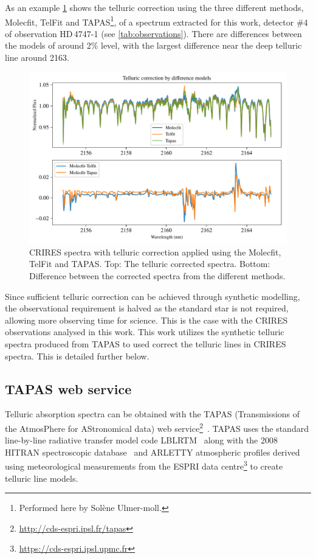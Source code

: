As an example \cref{fig:telluricmodelcomparision} shows the telluric correction using the three different methods, {Molecfit}, {TelFit} and {TAPAS}\footnote{Performed here by Sol\`{e}ne Ulmer-moll.}, of a spectrum extracted for this work, detector \#4 of observation HD\,4747-1  (see \cref{tab:observations}).
There are differences between the models of around 2\% level, with the largest difference near the deep telluric line around 2163\nm{}.
\begin{figure}
    \centering
    \includegraphics[width=0.8\linewidth]{figures/atmos_and_models/Telluric_model_comparision}
    \caption[Telluric correction applied using the {Molecfit}, {TelFit} and {TAPAS}.]{CRIRES spectra with telluric correction applied using the {Molecfit}, {TelFit} and {TAPAS}.
        Top: The telluric corrected spectra.
        Bottom: Difference between the corrected spectra from the different methods.}
    \label{fig:telluricmodelcomparision}
\end{figure}

Since sufficient telluric correction can be achieved through synthetic modelling, the observational requirement is halved as the standard star is not required, allowing more observing time for science.
This is the case with the {CRIRES} observations analysed in this work.
This work utilizes the synthetic telluric spectra produced from {TAPAS} to used correct the telluric lines in {CRIRES} spectra.
This is detailed further below.

\subsection{{TAPAS} web service}
\label{subsubsec:TAPAS}

Telluric absorption spectra can be obtained with the {TAPAS} (Transmissions of the AtmosPhere for AStronomical data) web service\footnote{\href{http://cds-espri.ipsl.fr/tapas}{http://cds-espri.ipsl.fr/tapas}}~\citep{bertaux_tapas_2014}.
{TAPAS} uses the standard line-by-line radiative transfer model code LBLRTM~\citep{clough_linebyline_1995} along with the 2008 {HITRAN} spectroscopic database~\citep{rothman_hitran_2009} and {ARLETTY} atmospheric profiles derived using meteorological measurements from the ESPRI data centre\footnote{\href{https://cds-espri.ipsl.upmc.fr}{https://cds-espri.ipsl.upmc.fr}} to create telluric line models.

